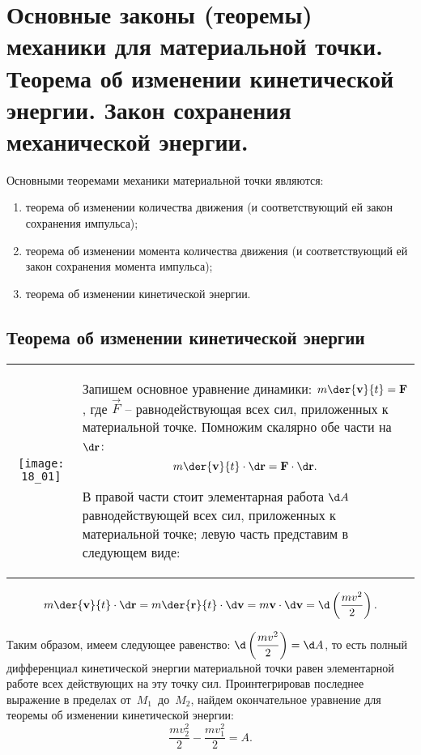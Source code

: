 \chapter{Основные законы (теоремы) механики для материальной точки. Теорема об
изменении кинетической энергии. Закон сохранения механической энергии.}

Основными теоремами механики материальной точки являются:
\begin{enumerate}
    \item теорема об изменении количества движения (и соответствующий ей закон
    сохранения импульса);
    \item теорема об изменении момента количества движения (и соответствующий ей
    закон сохранения момента импульса);
    \item теорема об изменении кинетической энергии.
\end{enumerate}

\section{Теорема об изменении кинетической энергии}

\begin{table}[h!]
    \begin{tabular}{C{.4}m{.5\textwidth}}
        \texttt{[image: 18\_01]} &
        Запишем основное уравнение динамики: \( \ds m\der{\vec{v}}{t} = \vec{F} \), где
        \( \vec{F} \) -- равнодействующая всех сил, приложенных к материальной точке.
        Помножим скалярно обе части на \( \d\vec{r} \):
        \[
            m\der{\vec{v}}{t}\cdot\d\vec{r} = \vec{F}\cdot\d\vec{r}.
        \]
        
        В правой части стоит элементарная работа \( \d A \) равнодействующей всех сил,
        приложенных к материальной точке; левую часть представим в следующем виде:
    \end{tabular}
\end{table}

\[
    m\der{\vec{v}}{t}\cdot\d\vec{r} = m\der{\vec{r}}{t}\cdot\d\vec{v} = m\vec{v}
    \cdot\d\vec{v} = \d\left(\frac{mv^2}{2}\right).
\]

Таким образом, имеем следующее равенство:
\( \ds \d\left(\frac{mv^2}{2}\right) = \d A\), то есть полный дифференциал
кинетической энергии материальной точки равен элементарной работе всех
действующих на эту точку сил. Проинтегрировав последнее выражение в пределах
от~\( M_1 \)~до~\( M_2 \), найдем окончательное уравнение для теоремы об изменении
кинетической энергии:
\[
    \frac{mv_2^2}{2} - \frac{mv_1^2}{2} = A.
\]


